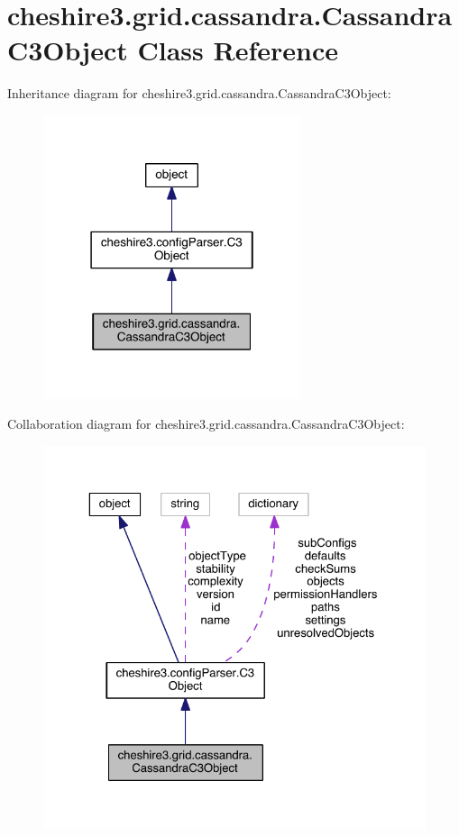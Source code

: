 \hypertarget{classcheshire3_1_1grid_1_1cassandra_1_1_cassandra_c3_object}{\section{cheshire3.\-grid.\-cassandra.\-Cassandra\-C3\-Object Class Reference}
\label{classcheshire3_1_1grid_1_1cassandra_1_1_cassandra_c3_object}
}


Inheritance diagram for cheshire3.\-grid.\-cassandra.\-Cassandra\-C3\-Object\-:
\nopagebreak
\begin{figure}[H]
\begin{center}
\leavevmode
\includegraphics[width=214pt]{classcheshire3_1_1grid_1_1cassandra_1_1_cassandra_c3_object__inherit__graph}
\end{center}
\end{figure}


Collaboration diagram for cheshire3.\-grid.\-cassandra.\-Cassandra\-C3\-Object\-:
\nopagebreak
\begin{figure}[H]
\begin{center}
\leavevmode
\includegraphics[width=325pt]{classcheshire3_1_1grid_1_1cassandra_1_1_cassandra_c3_object__coll__graph}
\end{center}
\end{figure}
